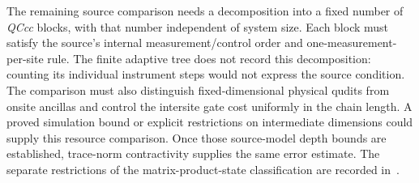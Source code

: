 \documentclass{article}
\begin{document}
The remaining source comparison needs a decomposition into a fixed number
of \textit{QCcc} blocks, with that number independent of system size. Each
block must satisfy the source's internal measurement/control order and
one-measurement-per-site rule. The finite adaptive tree does not record this
decomposition: counting its individual instrument steps would not express
the source condition. The comparison must also distinguish fixed-dimensional
physical qudits from onsite ancillas and control the intersite gate cost
uniformly in the chain length. A proved simulation bound or explicit
restrictions on intermediate dimensions could supply this resource comparison.
Once those source-model depth bounds are established, trace-norm contractivity
supplies the same error estimate. The separate restrictions of the
matrix-product-state classification are recorded
in~\cite{gap:psc21_mps_classification_scope}.



\end{document}
